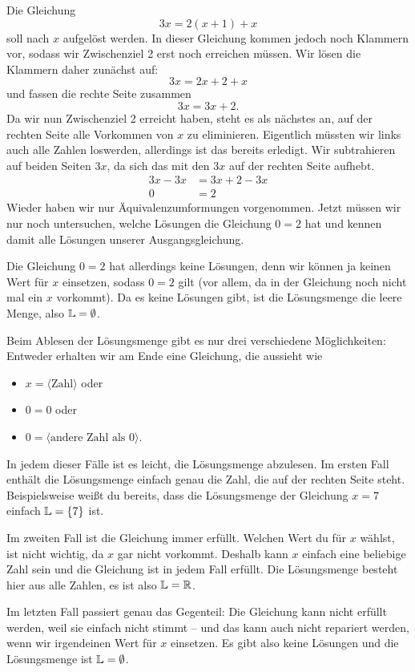 \documentclass[../../main.tex]{subfiles}
\begin{document}
\begin{example}{}
    Die Gleichung
    \[3x=2(x+1)+x\] 
    soll nach $x$ aufgelöst werden. In dieser Gleichung kommen jedoch noch Klammern vor, sodass wir Zwischenziel 2 erst noch erreichen müssen. Wir lösen die Klammern daher zunächst auf:
    \[3x=2x+2+x\]
    und fassen die rechte Seite zusammen
    \[3x=3x+2.\]
    Da wir nun Zwischenziel 2 erreicht haben, steht es als nächstes an, auf der rechten Seite alle Vorkommen von $x$ zu eliminieren. Eigentlich müssten wir links auch alle Zahlen loswerden, allerdings ist das bereits erledigt. Wir subtrahieren auf beiden Seiten $3x$, da sich das mit den $3x$ auf der rechten Seite aufhebt.
    \begin{align*}
        3x-3x&=3x+2-3x\\
        0&=2
    \end{align*}
    Wieder haben wir nur Äquivalenzumformungen vorgenommen. Jetzt müssen wir nur noch untersuchen, welche Lösungen die Gleichung $0=2$ hat und kennen damit alle Lösungen unserer Ausgangsgleichung.
    
    Die Gleichung $0=2$ hat allerdings keine Lösungen, denn wir können ja keinen Wert für $x$ einsetzen, sodass $0=2$ gilt (vor allem, da in der Gleichung noch nicht mal ein $x$ vorkommt). Da es keine Lösungen gibt, ist die Lösungsmenge die leere Menge, also $\mathbb{L}=\emptyset$.
\end{example}
Beim Ablesen der Lösungsmenge gibt es nur drei verschiedene Möglichkeiten: Entweder erhalten wir am Ende eine Gleichung, die aussieht wie 
\begin{itemize}
\item $x=\langle\text{Zahl}\rangle$ oder 
\item $0=0$ oder
\item $0=\langle\text{andere~Zahl~als~}0\rangle$.
\end{itemize}
In jedem dieser Fälle ist es leicht, die Lösungsmenge abzulesen. Im ersten Fall enthält die Lösungsmenge einfach genau die Zahl, die auf der rechten Seite steht. Beispielsweise weißt du bereits, dass die Lösungsmenge der Gleichung $x=7$ einfach $\mathbb{L}=\{7\}$ ist.

Im zweiten Fall ist die Gleichung immer erfüllt. Welchen Wert du für $x$ wählst, ist nicht wichtig, da $x$ gar nicht vorkommt. Deshalb kann $x$ einfach eine beliebige Zahl sein und die Gleichung ist in jedem Fall erfüllt. Die Lösungsmenge besteht hier aus alle Zahlen, es ist also $\mathbb{L}=\mathbb{R}$.

Im letzten Fall passiert genau das Gegenteil: Die Gleichung kann nicht erfüllt werden, weil sie einfach nicht stimmt -- und das kann auch nicht repariert werden, wenn wir irgendeinen Wert für $x$ einsetzen. Es gibt also keine Lösungen und die Lösungsmenge ist $\mathbb{L}=\emptyset$.
\end{document}
